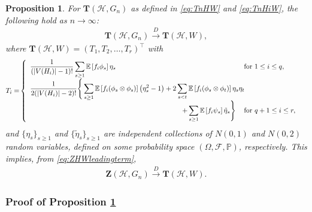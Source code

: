 \documentclass[11pt,reqno]{amsart}
\numberwithin{equation}{section}
\newcommand\dto{\overset{D}{\rightarrow}}
\newtheorem{prop}{Proposition}[section]
\theoremstyle{definition}
\begin{document}
\begin{prop}\label{ppn:linearTHW}
For  
$ \bm T(\mathcal H, G_n)$ as defined in \eqref{eq:TnHW} and \eqref{eq:TnHiW},  the following hold as $n \rightarrow \infty$: 
\begin{align*} 
 \bm T(\mathcal H, G_n) \dto  \bm T(\mathcal H, W) , 
\end{align*} 
where $\bm T(\mathcal H, W) = (T_1, T_2, \ldots, T_r)^\top$ with 
\begin{align*}
T_i  = & \left\{
\begin{array}{*2{>{\displaystyle}l}}
 \dfrac{1}{(|V(H_{i})|-1)!} \sum_{s \geq 1}\mathbb{E}\left[f_{i}\phi_{s}\right]\eta_{s}  & \hspace{-0.15in} \text{for } 1 \leq i \leq q , \\ 
 \dfrac{ 1 }{2(|V(H_{i})|-2)!} \Bigg\{ \sum_{s \geq 1}\mathbb{E}\left[f_{i}(\phi_{s}\otimes\phi_{s})\right]\left(\eta_{s}^2 - 1\right) + 2\sum_{s < t }\mathbb{E}\left[f_{i} (\phi_{s}\otimes\phi_{t})\right]\eta_{s}\eta_{t} \\ 
 \hspace{3.05in} + \sum_{s \geq 1}\mathbb{E}\left[f_{i}\psi_{s}\right]\tilde \eta_{s} \Bigg\} & \hspace{-0.15in} \text{for } q+1 \leq i \leq r, 
\end{array} 
\right. 
\end{align*}  
and $\{\eta_{s}\}_{s \geq 1}$ and $\{\tilde \eta_{s}\}_{s \geq 1}$ are independent collections of $N(0, 1)$ and $N(0, 2)$ random variables, defined on some probability space $\left(\Omega,\mathcal{F},\mathbb{P}\right)$, respectively. This implies, from \eqref{eq:ZHWleadingterm}, 
\begin{align*} 
 \bm Z(\mathcal H, G_n) \dto  \bm T(\mathcal H, W) . 
\end{align*} 
\end{prop} 


\subsubsection{Proof of Proposition \ref{ppn:linearTHW}}
\end{document}
